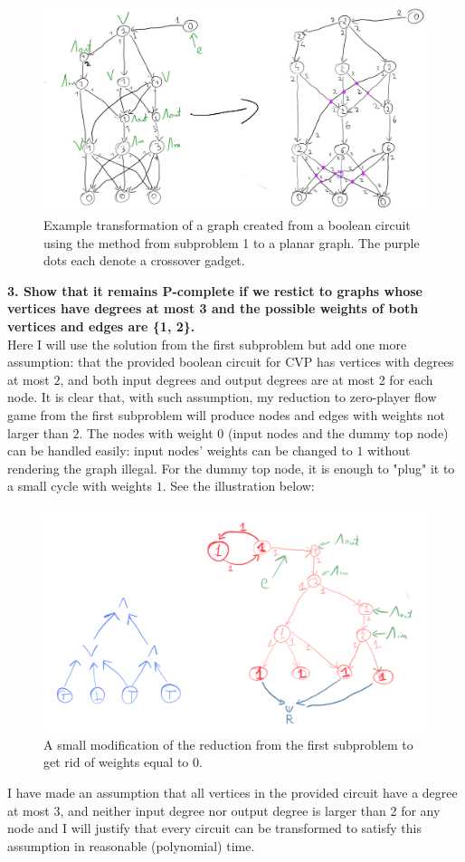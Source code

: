 \begin{figure}[H]
      \centering
      \caption{Example transformation of a graph created from a boolean circuit using the method
      from subproblem 1 to a planar graph. The purple dots each denote a crossover gadget.}
      \includegraphics[scale=0.1]{content/graphics/game20.png}
\end{figure}

\textbf{
      3. Show that it remains P-complete if we restict to graphs whose vertices have
      degrees at most 3 and the possible weights of both vertices and edges are
      \{1, 2\}.
}\\
Here I will use the solution from the first subproblem but add one more assumption: that the provided
boolean circuit for CVP has vertices with degrees at most $2$, and both input degrees and output degrees
are at most 2 for each node.
It is clear that, with such assumption, my reduction to zero-player flow game from the first subproblem
will produce nodes and edges with weights not larger than $2$. The nodes with weight $0$ (input nodes
and the dummy top node) can be handled easily: input nodes' weights can be changed to $1$ without rendering
the graph illegal. For the dummy top node, it is enough to "plug" it to a small cycle with weights $1$.
See the illustration below:
\begin{figure}[H]
      \centering
      \caption{A small modification of the reduction from the first subproblem to get rid of weights equal to $0$.}
      \includegraphics[scale=0.2]{content/graphics/game16.png}
\end{figure}
I have made an assumption that all vertices in the provided circuit have a degree at most 3, and neither input degree
nor output degree is larger than 2 for any node and I will justify that every circuit can be transformed to satisfy this
assumption in reasonable (polynomial) time.

